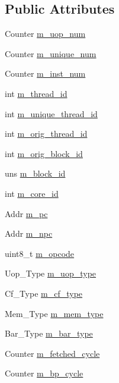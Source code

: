 \subsection*{Public Attributes}
\begin{DoxyCompactItemize}
\item 
Counter \hyperlink{classuop__c_ac38111e7296a5b8200866328c1826e71}{m\_\-uop\_\-num}
\item 
Counter \hyperlink{classuop__c_a3b6fcba563db0edda36f52978c638c4d}{m\_\-unique\_\-num}
\item 
Counter \hyperlink{classuop__c_a8f764aaa37e8d6cf7f5a9ce54b796f88}{m\_\-inst\_\-num}
\item 
int \hyperlink{classuop__c_a1be8c8d4660a12852650f4d8f2d4664b}{m\_\-thread\_\-id}
\item 
int \hyperlink{classuop__c_a393be438169e3d639387930aaf97c0d9}{m\_\-unique\_\-thread\_\-id}
\item 
int \hyperlink{classuop__c_a2203174651092ff60dd62029124c1ae1}{m\_\-orig\_\-thread\_\-id}
\item 
int \hyperlink{classuop__c_ac44b81eb2e89734fa5cded47ae8f275d}{m\_\-orig\_\-block\_\-id}
\item 
uns \hyperlink{classuop__c_a8d223e8fbd540bc687ad2243aa4ec2a2}{m\_\-block\_\-id}
\item 
int \hyperlink{classuop__c_afb8bcaae7c15cde79f3d551e91c8c66b}{m\_\-core\_\-id}
\item 
Addr \hyperlink{classuop__c_ae6f4147d85b5772d8fe5e0ad900aa9a2}{m\_\-pc}
\item 
Addr \hyperlink{classuop__c_a4aad3ee2a1aa0286421bc198866765b9}{m\_\-npc}
\item 
uint8\_\-t \hyperlink{classuop__c_aa9d298c300f17b0ffd24b3c994ddf667}{m\_\-opcode}
\item 
Uop\_\-Type \hyperlink{classuop__c_aa8674c436855849f9f2d0c8ab0267e3b}{m\_\-uop\_\-type}
\item 
Cf\_\-Type \hyperlink{classuop__c_a96dbe9b75914317162cad8cf8d4bbf1f}{m\_\-cf\_\-type}
\item 
Mem\_\-Type \hyperlink{classuop__c_a367c4313b99264de545c594bd0c60662}{m\_\-mem\_\-type}
\item 
Bar\_\-Type \hyperlink{classuop__c_ad954f77ae60ce234817968e983ee713b}{m\_\-bar\_\-type}
\item 
Counter \hyperlink{classuop__c_a3b7c8dfe378d88ea32546fc5c45f6da2}{m\_\-fetched\_\-cycle}
\item 
Counter \hyperlink{classuop__c_a02da65accb05bbdf6d911ab5916695f3}{m\_\-bp\_\-cycle}

\end{DoxyCompactItemize}
